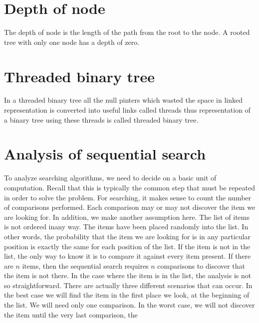 \documentclass{article}
\begin{document}
\section*{\textbf{Depth of node}}
The depth of node is the length of the path from the
root to the node. A rooted tree with only one node has
a depth of zero.
\section*{\textbf{Threaded binary tree}}
In a threaded binary tree all the null pinters which
wasted the space in linked representation is converted
into useful links called threads thus representation of a
binary tree using these threads is called threaded
binary tree.
\section*{\textbf{Analysis of sequential search}}
To analyze searching algorithms, we need to decide
on a basic unit of computation. Recall that this is
typically the common step that must be repeated in
order to solve the problem. For searching, it makes
sense to count the number of comparisons performed.
Each comparison may or may not discover the item
we are looking for. In addition, we make another
assumption here. The list of items is not ordered inany way. The items have been placed randomly into
the list. In other words, the probability that the item
we are looking for is in any particular position is
exactly the same for each position of the list.
If the item is not in the list, the only way to know it is
to compare it against every item present. If there are
\(n\) items, then the sequential search requires \(n\)
comparisons to discover that the item is not there. In
the case where the item is in the list, the analysis is
not so straightforward. There are actually three
different scenarios that can occur. In the best case we
will find the item in the first place we look, at the
beginning of the list. We will need only one
comparison. In the worst case, we will not discover
the item until the very last comparison, the 
\end{document}
